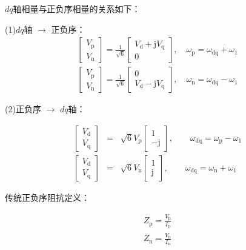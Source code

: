 \documentclass[12pt, a4paper, UTF8, fontset=adobe, scheme=chinese, heading=true, oneside]{ctexbook} %
\begin{document}
$dq$轴相量与正负序相量的关系如下：

(1)$dq$轴 $\rightarrow$ 正负序：
\begin{eqnarray}
  \label{eq:dq-np}
  \begin{bmatrix}
    V_{\mathrm{p}} \\ V_{\mathrm{n}} 
  \end{bmatrix} = \frac{1}{\sqrt{6}}
  \begin{bmatrix}
    V_{\mathrm{d}} + \mathrm{j}V_{\mathrm{q}} \\ 0
  \end{bmatrix},\quad \omega_{\mathrm{p}} = \omega_{\mathrm{dq}} + \omega_1 \\
  \begin{bmatrix}
    V_{\mathrm{p}} \\ V_{\mathrm{n}} 
  \end{bmatrix} = \frac{1}{\sqrt{6}}
  \begin{bmatrix}
    0 \\ V_{\mathrm{d}} - \mathrm{j}V_{\mathrm{q}}
  \end{bmatrix},\quad \omega_{\mathrm{n}} = \omega_{\mathrm{dq}} - \omega_1
\end{eqnarray}

(2)正负序 $\rightarrow$ $dq$轴：

\begin{eqnarray}
  \label{eq:np-dq}
  \begin{bmatrix}
    V_{\mathrm{d}} \\ V_{\mathrm{q}} 
  \end{bmatrix} & = & \sqrt{6}  V_{\mathrm{p}}
  \begin{bmatrix}
    1 \\ -\mathrm{j}
  \end{bmatrix}, \qquad \omega_{\mathrm{dq}} = \omega_{\mathrm{p}} -
    \omega_1 \\
  \begin{bmatrix}
    V_{\mathrm{d}} \\ V_{\mathrm{q}} 
  \end{bmatrix} & = & \sqrt{6}  V_{\mathrm{n}}
  \begin{bmatrix}
    1 \\ \mathrm{j}
  \end{bmatrix}, \qquad \omega_{\mathrm{dq}} = \omega_{\mathrm{n}} +
    \omega_1
\end{eqnarray}

传统正负序阻抗定义：

\begin{eqnarray}
  Z_{\mathrm{p}} = \frac{V_{\mathrm{p}}}{I_{\mathrm{p}}} \\
  Z_{\mathrm{n}} = \frac{V_{\mathrm{n}}}{I_{\mathrm{n}}}
\end{eqnarray}
\end{document}
